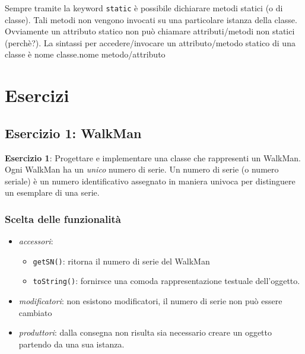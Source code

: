 \documentclass{article}
\begin{document}
Sempre tramite la keyword \texttt{static}
è possibile dichiarare metodi statici (o di classe).
Tali metodi non vengono invocati su una particolare
istanza della classe.
Ovviamente un attributo statico non può chiamare
attributi/metodi non statici (perchè?).
La sintassi per accedere/invocare un attributo/metodo statico
di una classe è
nome classe.nome metodo/attributo

\section{Esercizi}


\subsection{Esercizio 1: WalkMan}
\begin{framed}
\textbf{Esercizio 1}: Progettare e implementare una classe che rappresenti un WalkMan. Ogni WalkMan ha un \emph{unico} numero di serie. Un numero di serie (o numero seriale) è un numero identificativo assegnato in maniera univoca per distinguere un esemplare di una serie.
\end{framed}



\subsubsection{Scelta delle funzionalit\`a}

\begin{itemize}
\item \emph{accessori}: 
\begin{itemize}
\item \texttt{getSN()}: ritorna il numero di serie del WalkMan
\item \texttt{toString()}:  fornirsce una comoda rappresentazione testuale dell'oggetto.
\end{itemize}
\item \emph{modificatori}: non esistono modificatori, il numero di serie non pu\`o essere cambiato
\item \emph{produttori}: dalla consegna non risulta sia necessario creare un oggetto partendo da una sua istanza.
\end{itemize}
\end{document}
